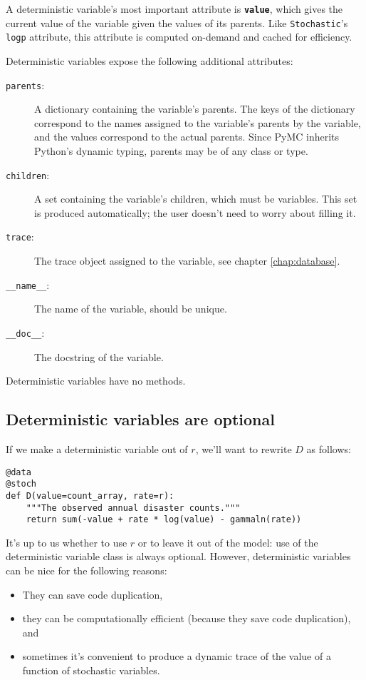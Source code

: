 A deterministic variable's most important attribute is \texttt{\bfseries value}, which gives the current value of the variable given the values of its parents. Like \texttt{Stochastic}'s \texttt{logp} attribute, this attribute is computed on-demand and cached for efficiency.

Deterministic variables expose the following additional attributes:
\begin{description}
    \item[\texttt{parents}:] A dictionary containing the variable's parents. The keys of the dictionary correspond to the names assigned to the variable's parents by the variable, and the values correspond to the actual parents. Since PyMC inherits Python's dynamic typing, parents may be of any class or type.
    \item[\texttt{children}:] A set containing the variable's children, which must be variables. This set is produced automatically; the user doesn't need to worry about filling it.
    \item[\texttt{trace}:] The trace object assigned to the variable, see chapter \ref{chap:database}.
    \item[\texttt{\_\_name\_\_}:] The name of the variable, should be unique.
    \item[\texttt{\_\_doc\_\_}:] The docstring of the variable.
\end{description}
Deterministic variables have no methods.

\subsection{Deterministic variables are optional}
If we make a deterministic variable out of $r$, we'll want to rewrite $D$ as follows:
\begin{verbatim}
@data
@stoch
def D(value=count_array, rate=r):
    """The observed annual disaster counts."""
    return sum(-value + rate * log(value) - gammaln(rate))
\end{verbatim}
It's up to us whether to use $r$ or to leave it out of the model: use of the deterministic variable class is always optional. However, deterministic variables can be nice for the following reasons:
\begin{itemize}
    \item They can save code duplication,    
    \item they can be computationally efficient (because they save code duplication), and
    \item sometimes it's convenient to produce a dynamic trace of the value of a function of stochastic variables.
\end{itemize}



